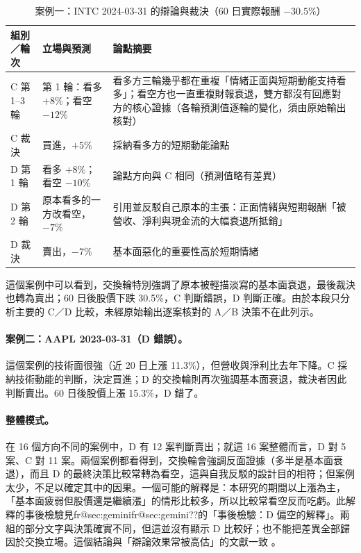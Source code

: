 \documentclass[12pt,a4paper]{article}
\makeatletter
\numberwithin{table}{section}
\numberwithin{figure}{section}
\newcommand{\frref}[1]{\ifcsname fr@#1\endcsname\csname fr@#1\endcsname\else ??\fi}
\newcommand{\grp}[1]{\textsf{#1}}
\makeatother
\begin{document}
\begin{table}[H]
\centering\small
\caption{案例一：INTC 2024-03-31 的辯論與裁決（60 日實際報酬 $-30.5\%$）}
\label{tab:case}
\begin{tabularx}{\textwidth}{@{}L{.17} L{.22} Y@{}}
\toprule
組別／輪次 & 立場與預測 & 論點摘要 \\
\midrule
\grp{C} 第 1--3 輪 & 第 1 輪：看多 $+8\%$；看空 $-12\%$ & 看多方三輪幾乎都在重複「情緒正面與短期動能支持看多」；看空方也一直重複財報衰退，雙方都沒有回應對方的核心證據（各輪預測值逐輪的變化，須由原始輸出核對） \\
\grp{C} 裁決 & 買進，$+5\%$ & 採納看多方的短期動能論點 \\
\midrule
\grp{D} 第 1 輪 & 看多 $+8\%$；看空 $-10\%$ & 論點方向與 \grp{C} 相同（預測值略有差異） \\
\grp{D} 第 2 輪 & 原本看多的一方改看空，$-7\%$ & 引用並反駁自己原本的主張：正面情緒與短期報酬「被營收、淨利與現金流的大幅衰退所抵銷」 \\
\grp{D} 裁決 & 賣出，$-7\%$ & 基本面惡化的重要性高於短期情緒 \\
\bottomrule
\end{tabularx}
\end{table}

這個案例中可以看到，交換輪特別強調了原本被輕描淡寫的基本面衰退，最後裁決也轉為賣出；60 日後股價下跌 30.5\%，\grp{C} 判斷錯誤，\grp{D} 判斷正確。由於本段只分析主要的 C／D 比較，未經原始輸出逐案核對的 A／B 決策不在此列示。

\paragraph{案例二：AAPL 2023-03-31（\grp{D} 錯誤）。} 這個案例的技術面很強（近 20 日上漲 11.3\%），但營收與淨利比去年下降。\grp{C} 採納技術動能的判斷，決定買進；\grp{D} 的交換輪則再次強調基本面衰退，裁決者因此判斷賣出。60 日後股價上漲 15.3\%，\grp{D} 錯了。

\paragraph{整體模式。} 在 16 個方向不同的案例中，\grp{D} 有 12 案判斷賣出；就這 16 案整體而言，D 對 5 案、C 對 11 案。兩個案例都看得到，交換輪會強調反面證據（多半是基本面衰退），而且 \grp{D} 的最終決策比較常轉為看空，這與自我反駁的設計目的相符；但案例太少，不足以確定其中的因果。一個可能的解釋是：本研究的期間以上漲為主，「基本面疲弱但股價還是繼續漲」的情形比較多，所以比較常看空反而吃虧。此解釋的事後檢驗見\frref{sec:gemini}的「事後檢驗：\grp{D} 偏空的解釋」。兩組的部分文字與決策確實不同，但這並沒有顯示 D 比較好；也不能把差異全部歸因於交換立場。這個結論與「辯論效果常被高估」的文獻一致 \citep{smit2023mad,zhang2025stop}。
\end{document}
